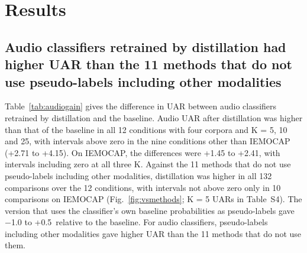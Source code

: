 \FloatBarrier
\section{Results}\label{sec:results}

\subsection{Audio classifiers retrained by distillation had higher UAR than the 11 methods that do not use pseudo-labels including other modalities}\label{sec:res-methods}
Table~\ref{tab:audiogain} gives the difference in UAR between audio classifiers retrained by distillation and the baseline. Audio UAR after distillation was higher than that of the baseline in all 12 conditions with four corpora and K = 5, 10 and 25, with intervals above zero in the nine conditions other than IEMOCAP (+2.71 to +4.15\pt). On IEMOCAP, the differences were +1.45 to +2.41\pt, with intervals including zero at all three K. Against the 11 methods that do not use pseudo-labels including other modalities, distillation was higher in all 132 comparisons over the 12 conditions, with intervals not above zero only in 10 comparisons on IEMOCAP (Fig.~\ref{fig:vsmethods}; K = 5 UARs in Table~S4). The version that uses the classifier's own baseline probabilities as pseudo-labels gave $-$1.0 to +0.5\pt\ relative to the baseline. For audio classifiers, pseudo-labels including other modalities gave higher UAR than the 11 methods that do not use them.


